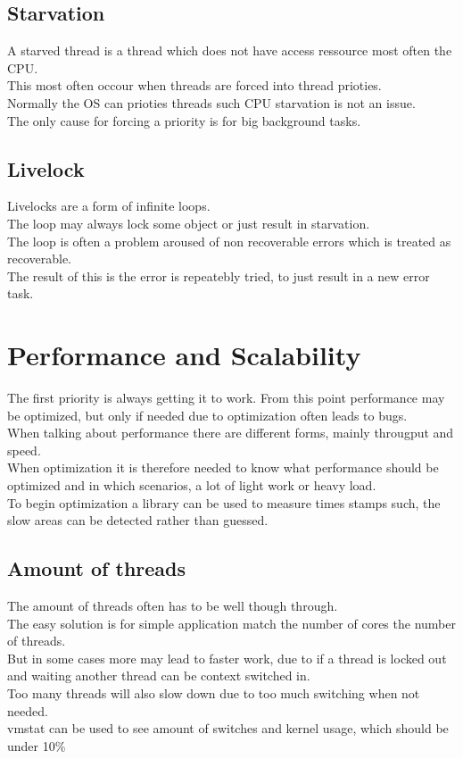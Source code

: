 \documentclass[12pt, a4paper]{article}
\begin{document}
		\subsection{Starvation}
			A starved thread is a thread which does not have access ressource most often the CPU.\\
			This most often occour when threads are forced into thread prioties.\\
			Normally the OS can prioties threads such CPU starvation is not an issue.\\
			The only cause for forcing a priority is for big background tasks.
		\subsection{Livelock}
			Livelocks are a form of infinite loops.\\
			The loop may always lock some object or just result in starvation.\\
			The loop is often a problem aroused of non recoverable errors which is treated as recoverable.\\
			The result of this is the error is repeatebly tried, to just result in a new error task.
	\section{Performance and Scalability}
		The first priority is always getting it to work. From this point performance may be optimized, but only if needed due to optimization often leads to bugs.\\
		When talking about performance there are different forms, mainly througput and speed.\\
		When optimization it is therefore needed to know what performance should be optimized and in which scenarios, a lot of light work or heavy load.\\
		To begin optimization a library can be used to measure times stamps such, the slow areas can be detected rather than guessed.\\
		\subsection{Amount of threads}
			The amount of threads often has to be well though through.\\
			The easy solution is for simple application match the number of cores the number of threads.\\
			But in some cases more may lead to faster work, due to if a thread is locked out and waiting another thread can be context switched in.\\
			Too many threads will also slow down due to too much switching when not needed.\\
			vmstat can be used to see amount of switches and kernel usage, which should be under 10\%\\
\end{document}
